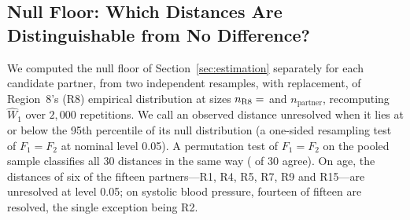 \documentclass[AMA,Times1COL]{WileyNJDv5}
\begin{document}
\subsection{Null Floor: Which Distances Are Distinguishable from No Difference?}\label{sec:app_operability}

We computed the null floor of Section~\ref{sec:estimation} separately for each candidate partner, from two independent resamples, with replacement, of Region~8's (R8) empirical distribution at sizes $n_{\text{R8}} = \numval{nR8floor}$ and $n_{\text{partner}}$, recomputing $\widehat{W}_1$ over $2{,}000$ repetitions. %
We call an observed distance unresolved when it lies at or below the 95th percentile of its null distribution (a one-sided resampling test of $F_1 = F_2$ at nominal level 0.05). A permutation test of $F_1 = F_2$ on the pooled sample classifies all 30 distances in the same way ( of 30 agree). On age, the distances of six of the fifteen partners---R1, R4, R5, R7, R9 and R15---are unresolved at level 0.05; on systolic blood pressure, fourteen of fifteen are resolved, the single exception being R2.
\end{document}
